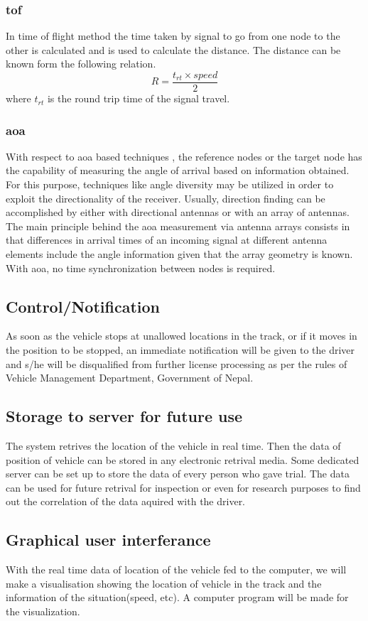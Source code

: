 \subsubsection{\gls{tof}}
In time of flight method the time taken by signal to go from one node to the other is calculated and is used to calculate the distance. The distance can be known form the following relation.
\begin{equation}
	R = \frac{t_{rt} \times speed}{2}
\end{equation}
where $t_{rt}$ is the round trip time of the signal travel.

\subsubsection{\gls{aoa}} 
With respect to \gls{aoa} based techniques , the reference nodes or the target node has the capability of measuring the angle of arrival based on information obtained. For this purpose, techniques like angle diversity may be utilized in order to exploit the directionality of the receiver. Usually, direction finding can be accomplished by either with directional antennas or with an array of antennas. The main  principle behind the \gls{aoa} measurement via antenna arrays consists in that differences in arrival times of an incoming signal at different antenna elements include the angle information given that the array geometry is known. With \gls{aoa}, no time synchronization between nodes is required.\cite{1003.1833}

	\subsection{Control/Notification}
		As soon as the vehicle stops at unallowed locations in the track, or if it moves in the position to be stopped, an immediate notification will be given to the driver and s/he will be disqualified from further license processing as per the rules of Vehicle Management Department, Government of Nepal.

	\subsection{Storage to server for future use}
		The system retrives the location of the vehicle in real time. Then the data of position of vehicle can be stored in any electronic retrival media. Some dedicated server can be set up to store the data of every person who gave trial. The data can be used for future retrival for inspection or even for research purposes to find out the correlation of the data aquired with the driver.  
	\subsection{Graphical user interferance}
		With the real time data of location of the vehicle fed to the computer, we will make a visualisation showing the location of vehicle in the track and the information of the situation(speed, etc). A computer program will be made for the visualization. 
